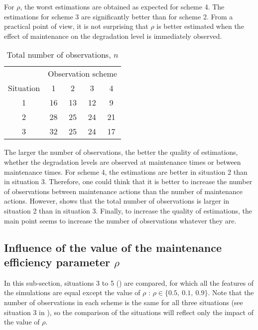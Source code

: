 For $\rho$, the worst estimations are obtained as expected for scheme 4. The estimations for scheme 3 are significantly better than for scheme 2. From a practical point of view, it is not surprising that $\rho$  is better estimated when  the effect of maintenance on the degradation level is immediately observed.


\begin{table} [!h]
\caption{Total number of observations, $n$}
\centering
\label{table:n}
\begin{tabular}{|c|c|c|c|c|}
\cline{2-5}
\multicolumn{1}{c|}{}& \multicolumn{4}{c|}{Observation scheme} \\
\cline{1-1}

Situation & \multicolumn{1}{c}{1}&\multicolumn{1}{c}{2}&\multicolumn{1}{c}{3}&\multicolumn{1}{c|}{4}  \\
\cline{2-5}
1& 16&13&12&9\\
2&28 &25 &24 &21  \\
3 &32&25&24&17\\

\hline
\end{tabular}
\end{table}

The larger the number of observations, the better the quality of estimations, whether the degradation levels are observed at maintenance times or between maintenance times.
For scheme 4, the estimations are better in situation 2 than in situation 3. Therefore, one could think that it is better to increase the number of observations between maintenance actions than the number of maintenance actions. However,  shows that the total number of observations is larger in situation 2 than in situation 3. Finally, to increase the quality of estimations, the main point seems to increase the number of observations whatever they are.



\subsection{Influence of the value of the maintenance efficiency parameter $\rho$}

In this sub-section, situations 3 to 5 () are compared, for which all the features of the simulations are equal except the value of $\rho$ : $\rho \in \{0.5,\ 0.1,\ 0.9\}$.
Note that the number of observations in each scheme is the same for all three situations (see situation 3 in ), so the comparison of the situations will reflect only the impact of the value of $\rho$.

